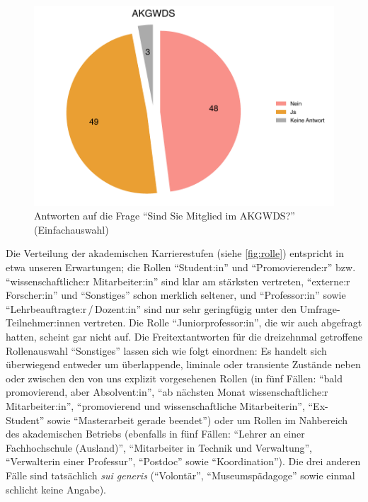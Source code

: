 \documentclass{scrartcl}
\begin{document}
\begin{figure}[t]
   \includegraphics[width=1\textwidth]{akgwds.pdf}
   \caption{Antworten auf die Frage \enquote{Sind Sie Mitglied im AKGWDS?} (Einfachauswahl)}
   \label{fig:akgwds}
\end{figure}

Die Verteilung der akademischen Karrierestufen (siehe \autoref{fig:rolle}) entspricht in etwa unseren Erwartungen; die Rollen \enquote{Student:in} und \enquote{Promovierende:r} bzw. \enquote{wissenschaftliche:r Mitarbeiter:in} sind klar am stärksten vertreten, \enquote{externe:r Forscher:in} und \enquote{Sonstiges} schon merklich seltener, und \enquote{Professor:in} sowie \enquote{Lehrbeauftragte:r\,/\,Do\-zen\-t:in} sind nur sehr geringfügig unter den Umfrage-Teilnehmer:innen vertreten.
Die Rolle \enquote{Juniorprofessor:in}, die wir auch abgefragt hatten, scheint gar nicht auf.
Die Freitextantworten für die dreizehnmal getroffene Rollenauswahl \enquote{Sonstiges} lassen sich wie folgt einordnen:
Es handelt sich überwiegend entweder um überlappende, liminale oder transiente Zustände neben oder zwischen den von uns explizit vorgesehenen Rollen (in fünf Fällen: \enquote{bald promovierend, aber Absolvent:in}, \enquote{ab nächsten Monat wissenschaftliche:r Mitarbeiter:in}, \enquote{promovierend und wissenschaftliche Mitarbeiterin}, \enquote{Ex-Student} sowie \enquote{Masterarbeit gerade beendet}) oder um Rollen im Nahbereich des akademischen Betriebs (ebenfalls in fünf Fällen: \enquote{Lehrer an einer Fachhochschule (Ausland)}, \enquote{Mitarbeiter in Technik und Verwaltung}, \enquote{Verwalterin einer Professur}, \enquote{Postdoc} sowie \enquote{Koordination}).
Die drei anderen Fälle sind tatsächlich \textit{sui generis} (\enquote{Volontär}, \enquote{Museumspädagoge} sowie einmal schlicht keine Angabe).
\end{document}
